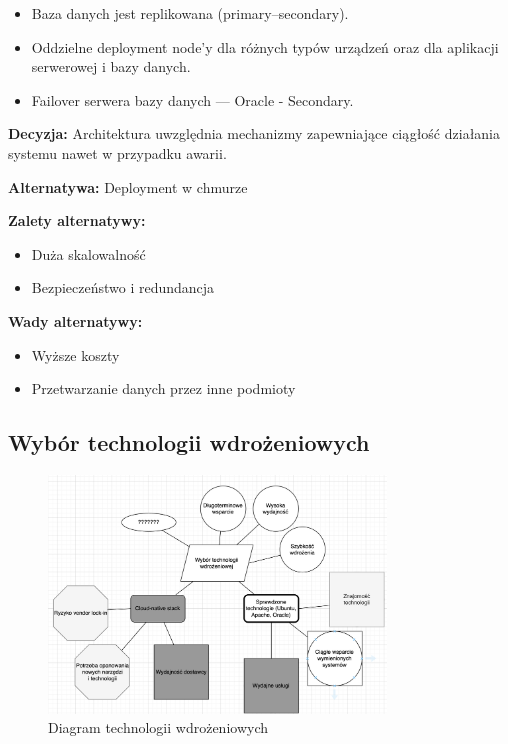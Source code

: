 \documentclass[12pt]{article}
\begin{document}
\begin{itemize}
\item Baza danych jest replikowana (primary–secondary).
\item Oddzielne deployment node'y dla różnych typów urządzeń oraz dla aplikacji serwerowej i bazy danych.
\item Failover serwera bazy danych — Oracle - Secondary.
\end{itemize}

\textbf{Decyzja:} Architektura uwzględnia mechanizmy zapewniające ciągłość działania systemu nawet w przypadku awarii.

\textbf{Alternatywa:} Deployment w chmurze

\textbf{Zalety alternatywy:}
\begin{itemize}
\item Duża skalowalność
\item Bezpieczeństwo i redundancja
\end{itemize}

\textbf{Wady alternatywy:}
\begin{itemize}
\item Wyższe koszty
\item Przetwarzanie danych przez inne podmioty
\end{itemize}

\subsection{Wybór technologii wdrożeniowych}
\begin{figure}[H]
\centering
\includegraphics[width=0.8\textwidth]{wybor_technologii_wdrozeniowej.png}
\caption{Diagram technologii wdrożeniowych}
\label{fig:deployment-tech}
\end{figure}
\end{document}
